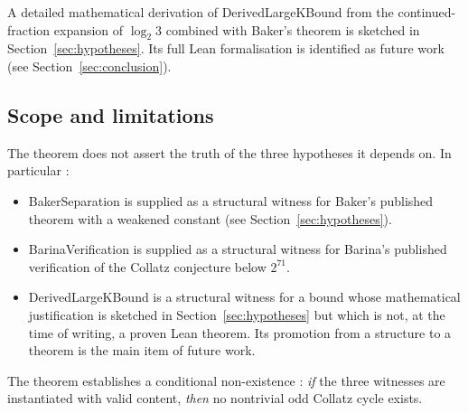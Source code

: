 A detailed mathematical derivation of
\textsf{DerivedLargeKBound} from the continued-fraction expansion of
\(\log_2 3\) combined with Baker's theorem is sketched in
Section~\ref{sec:hypotheses}. Its full Lean formalisation is identified
as future work (see Section~\ref{sec:conclusion}).

\subsection{Scope and limitations}

\begin{remark}
The theorem does not assert the truth of the three hypotheses it depends
on. In particular :
\begin{itemize}
  \item \textsf{BakerSeparation} is supplied as a structural witness for
        Baker's published theorem with a weakened constant
        (see Section~\ref{sec:hypotheses}).
  \item \textsf{BarinaVerification} is supplied as a structural witness
        for Barina's published verification of the Collatz conjecture
        below \(2^{71}\).
  \item \textsf{DerivedLargeKBound} is a structural witness for a bound
        whose mathematical justification is sketched in
        Section~\ref{sec:hypotheses} but which is not, at the time of
        writing, a proven Lean theorem. Its promotion from a structure
        to a theorem is the main item of future work.
\end{itemize}
The theorem establishes a conditional non-existence : \emph{if} the three
witnesses are instantiated with valid content, \emph{then} no nontrivial
odd Collatz cycle exists.
\end{remark}
